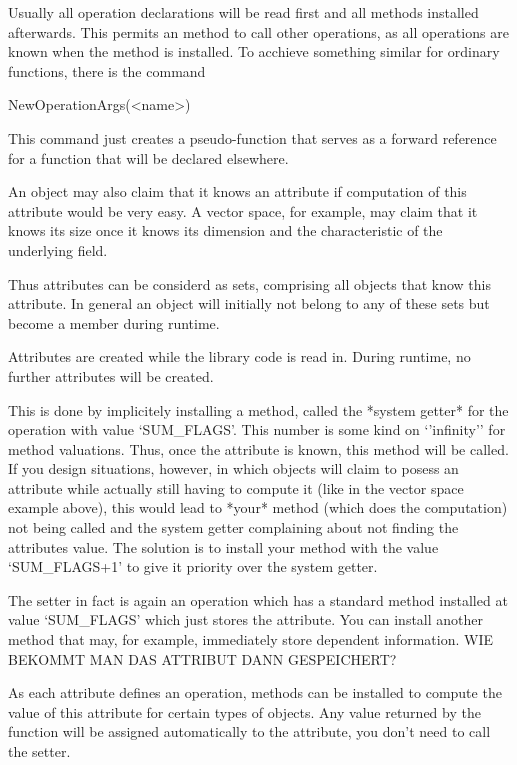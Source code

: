 Usually all operation declarations will be read first and all methods
installed afterwards. This permits an method to call other operations, as
all operations are known when the method is installed. To acchieve something
similar for ordinary functions, there is the command

\>NewOperationArgs(<name>)

This command just creates a pseudo-function that serves as a forward
reference for a function that will be declared elsewhere.



\danger
An object may also claim that it knows an attribute if computation of this
attribute would be very easy. A vector space, for example, may claim that
it knows its size once it knows its dimension and the characteristic of the
underlying field. 

Thus attributes can be considerd as sets, comprising all objects that know
this attribute. In general an object will initially not belong to any of
these sets but become a member during runtime.

\danger
Attributes are created while the library code is read in. During runtime, no
further attributes will be created.


\danger
This is done by implicitely installing a method, called the *system getter*
for the operation with value `SUM_FLAGS'. This number is some kind on
`'infinity'' for method valuations. Thus, once the attribute is known, this
method will be called. If you design situations, however, in
which objects will claim to posess an attribute while actually still having
to compute it (like in the vector space example above), this would lead to
*your* method (which does the computation) not being called and the system
getter complaining about not finding the attributes value. The solution is 
to install your method with the value `SUM_FLAGS+1' to give it priority
over the system getter.


\danger
The setter in fact is again an operation which has a standard method
installed at value `SUM_FLAGS' which just stores the attribute. You can
install another method that may, for example, immediately store
dependent information. WIE BEKOMMT MAN DAS ATTRIBUT DANN GESPEICHERT?

As each attribute defines an operation, methods can be installed to compute 
the value of this attribute for certain types of objects. Any value returned
by the function will be assigned automatically to the attribute, you don't
need to call the setter.

